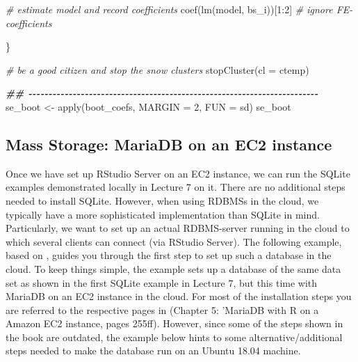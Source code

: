 \documentclass[
  12pt,
]{style/krantz}
\newenvironment{Shaded}{\begin{snugshade}}{\end{snugshade}}
\newcommand{\AttributeTok}[1]{\textcolor[rgb]{0.77,0.63,0.00}{#1}}
\newcommand{\CommentTok}[1]{\textcolor[rgb]{0.56,0.35,0.01}{\textit{#1}}}
\newcommand{\DecValTok}[1]{\textcolor[rgb]{0.00,0.00,0.81}{#1}}
\newcommand{\DocumentationTok}[1]{\textcolor[rgb]{0.56,0.35,0.01}{\textbf{\textit{#1}}}}
\newcommand{\FunctionTok}[1]{\textcolor[rgb]{0.00,0.00,0.00}{#1}}
\newcommand{\NormalTok}[1]{#1}
\newcommand{\OtherTok}[1]{\textcolor[rgb]{0.56,0.35,0.01}{#1}}
\newcommand{\SpecialCharTok}[1]{\textcolor[rgb]{0.00,0.00,0.00}{#1}}
\begin{document}
\begin{Shaded}
\begin{Highlighting}[]
    \CommentTok{\# estimate model and record coefficients}
    \FunctionTok{coef}\NormalTok{(}\FunctionTok{lm}\NormalTok{(model, bs\_i))[}\DecValTok{1}\SpecialCharTok{:}\DecValTok{2}\NormalTok{] }\CommentTok{\# ignore FE{-}coefficients}
    
\NormalTok{  \}}


\CommentTok{\# be a good citizen and stop the snow clusters}
\FunctionTok{stopCluster}\NormalTok{(}\AttributeTok{cl =}\NormalTok{ ctemp)}



\DocumentationTok{\#\# {-}{-}{-}{-}{-}{-}{-}{-}{-}{-}{-}{-}{-}{-}{-}{-}{-}{-}{-}{-}{-}{-}{-}{-}{-}{-}{-}{-}{-}{-}{-}{-}{-}{-}{-}{-}{-}{-}{-}{-}{-}{-}{-}{-}{-}{-}{-}{-}{-}{-}{-}{-}{-}{-}{-}{-}{-}{-}{-}{-}{-}{-}{-}{-}{-}{-}{-}{-}{-}{-}{-}{-}}
\NormalTok{se\_boot }\OtherTok{\textless{}{-}} \FunctionTok{apply}\NormalTok{(boot\_coefs, }
                 \AttributeTok{MARGIN =} \DecValTok{2}\NormalTok{,}
                 \AttributeTok{FUN =}\NormalTok{ sd)}
\NormalTok{se\_boot}
\end{Highlighting}
\end{Shaded}

\hypertarget{mass-storage-mariadb-on-an-ec2-instance}{%
\subsection{Mass Storage: MariaDB on an EC2 instance}\label{mass-storage-mariadb-on-an-ec2-instance}}

Once we have set up RStudio Server on an EC2 instance, we can run the SQLite examples demonstrated locally in Lecture 7 on it. There are no additional steps needed to install SQLite. However, when using RDBMSs in the cloud, we typically have a more sophisticated implementation than SQLite in mind. Particularly, we want to set up an actual RDBMS-server running in the cloud to which several clients can connect (via RStudio Server). The following example, based on \citet{walkowiak_2016}, guides you through the first step to set up such a database in the cloud. To keep things simple, the example sets up a database of the same data set as shown in the first SQLite example in Lecture 7, but this time with MariaDB on an EC2 instance in the cloud. For most of the installation steps you are referred to the respective pages in \citet{walkowiak_2016} (Chapter 5: 'MariaDB with R on a Amazon EC2 instance, pages 255ff). However, since some of the steps shown in the book are outdated, the example below hints to some alternative/additional steps needed to make the database run on an Ubuntu 18.04 machine.
\end{document}
